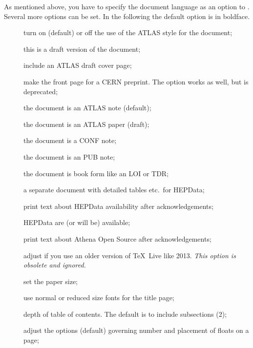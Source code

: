 As mentioned above, you have to specify the document language as an option to .
Several more options can be set.
In the following the default option is in boldface.
\begin{description}
\item[] turn on (default) or off the use of the ATLAS style for the document;
\item[] this is a draft version of the document;
\item[] include an ATLAS draft cover page;
\item[] make the front page for a CERN preprint.
  The option  works as well, but is deprecated;
\item[] the document is an ATLAS note (default);
\item[] the document is an ATLAS paper (draft);
\item[] the document is a CONF note;
\item[] the document is an PUB note;
\item[] the document is book form like an LOI or TDR;
\item[] a separate document with detailed tables etc.\ for HEPData;
\item[] print text about HEPData availability after acknowledgements;
\item[] HEPData are (or will be) available;
\item[] print text about Athena Open Source after acknowledgements;
\item[] adjust if you use an older version of \TeX\ Live like 2013.
  \emph{ This option is obsolete and ignored.}
\item[] set the paper size;
\item[] use normal or reduced size fonts for the title page;
\item[] depth of table of contents. The default is to include subsections (2);
\item[] adjust the options (default) governing number and placement of floats on a page;

\end{description}
